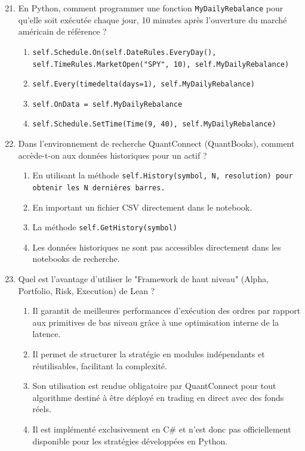 \documentclass[a4paper,12pt]{article}
\begin{document}
\begin{enumerate}
    \setcounter{enumi}{20}
    \item En Python, comment programmer une fonction \texttt{MyDailyRebalance} pour qu'elle soit exécutée chaque jour, 10 minutes après l'ouverture du marché américain de référence ?
    \begin{enumerate}[label=(\Alph*)]
        \item \texttt{self.Schedule.On(self.DateRules.EveryDay(), self.TimeRules.MarketOpen("SPY", 10), self.MyDailyRebalance)}
        \item \texttt{self.Every(timedelta(days=1), self.MyDailyRebalance)}
        \item \texttt{self.OnData = self.MyDailyRebalance}
        \item \texttt{self.Schedule.SetTime(Time(9, 40), self.MyDailyRebalance)}
    \end{enumerate}

    \item Dans l'environnement de recherche QuantConnect (QuantBooks), comment accède-t-on aux données historiques pour un actif ?
    \begin{enumerate}[label=(\Alph*)]
        \item En utilisant la méthode \texttt{self.History(symbol, N, resolution) pour obtenir les N dernières barres.}
        \item En important un fichier CSV directement dans le notebook.
        \item La méthode \texttt{self.GetHistory(symbol)}
        \item Les données historiques ne sont pas accessibles directement dans les notebooks de recherche.
    \end{enumerate}

    \item Quel est l'avantage d'utiliser le "Framework de haut niveau" (Alpha, Portfolio, Risk, Execution) de Lean ?
    \begin{enumerate}[label=(\Alph*)]
        \item Il garantit de meilleures performances d'exécution des ordres par rapport aux primitives de bas niveau grâce à une optimisation interne de la latence.
        \item Il permet de structurer la stratégie en modules indépendants et réutilisables, facilitant la complexité.
        \item Son utilisation est rendue obligatoire par QuantConnect pour tout algorithme destiné à être déployé en trading en direct avec des fonds réels.
        \item Il est implémenté exclusivement en C\# et n'est donc pas officiellement disponible pour les stratégies développées en Python.
    \end{enumerate}


\end{enumerate}
\end{document}
